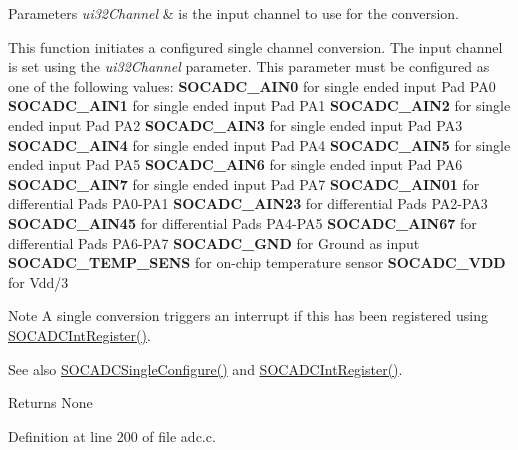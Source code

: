 \begin{DoxyParams}{Parameters}
{\em ui32\+Channel} & is the input channel to use for the conversion.\\
\hline
\end{DoxyParams}
This function initiates a configured single channel conversion. The input channel is set using the {\itshape ui32\+Channel} parameter. This parameter must be configured as one of the following values\+: {\bfseries S\+O\+C\+A\+D\+C\+\_\+\+A\+I\+N0} for single ended input Pad P\+A0 {\bfseries S\+O\+C\+A\+D\+C\+\_\+\+A\+I\+N1} for single ended input Pad P\+A1 {\bfseries S\+O\+C\+A\+D\+C\+\_\+\+A\+I\+N2} for single ended input Pad P\+A2 {\bfseries S\+O\+C\+A\+D\+C\+\_\+\+A\+I\+N3} for single ended input Pad P\+A3 {\bfseries S\+O\+C\+A\+D\+C\+\_\+\+A\+I\+N4} for single ended input Pad P\+A4 {\bfseries S\+O\+C\+A\+D\+C\+\_\+\+A\+I\+N5} for single ended input Pad P\+A5 {\bfseries S\+O\+C\+A\+D\+C\+\_\+\+A\+I\+N6} for single ended input Pad P\+A6 {\bfseries S\+O\+C\+A\+D\+C\+\_\+\+A\+I\+N7} for single ended input Pad P\+A7 {\bfseries S\+O\+C\+A\+D\+C\+\_\+\+A\+I\+N01} for differential Pads P\+A0-\/\+P\+A1 {\bfseries S\+O\+C\+A\+D\+C\+\_\+\+A\+I\+N23} for differential Pads P\+A2-\/\+P\+A3 {\bfseries S\+O\+C\+A\+D\+C\+\_\+\+A\+I\+N45} for differential Pads P\+A4-\/\+P\+A5 {\bfseries S\+O\+C\+A\+D\+C\+\_\+\+A\+I\+N67} for differential Pads P\+A6-\/\+P\+A7 {\bfseries S\+O\+C\+A\+D\+C\+\_\+\+G\+ND} for Ground as input {\bfseries S\+O\+C\+A\+D\+C\+\_\+\+T\+E\+M\+P\+\_\+\+S\+E\+NS} for on-\/chip temperature sensor {\bfseries S\+O\+C\+A\+D\+C\+\_\+\+V\+DD} for Vdd/3

\begin{DoxyNote}{Note}
A single conversion triggers an interrupt if this has been registered using \hyperlink{group__adc__api_ga95ca16f5e0870ecda7d0113b301e42dd}{S\+O\+C\+A\+D\+C\+Int\+Register()}.
\end{DoxyNote}
\begin{DoxySeeAlso}{See also}
\hyperlink{group__adc__api_ga96d92c8cc062f4c45831f5b128bc21da}{S\+O\+C\+A\+D\+C\+Single\+Configure()} and \hyperlink{group__adc__api_ga95ca16f5e0870ecda7d0113b301e42dd}{S\+O\+C\+A\+D\+C\+Int\+Register()}.
\end{DoxySeeAlso}
\begin{DoxyReturn}{Returns}
None 
\end{DoxyReturn}


Definition at line 200 of file adc.\+c.

